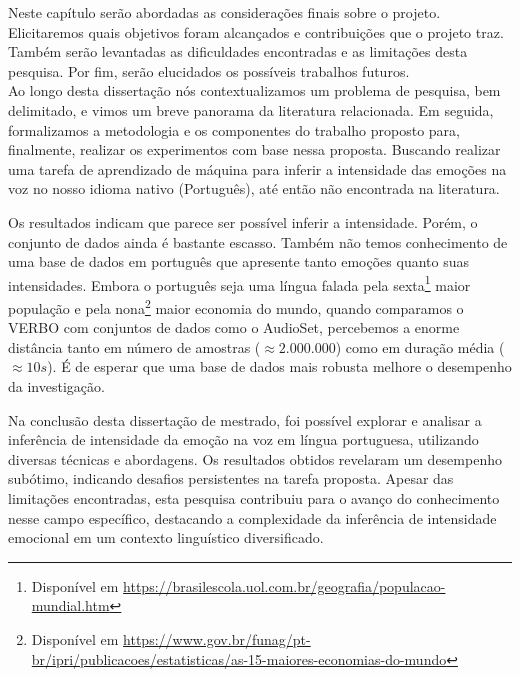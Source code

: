 
Neste capítulo serão abordadas as considerações finais sobre o projeto. Elicitaremos quais objetivos foram alcançados e contribuições que o projeto traz. Também serão levantadas as dificuldades encontradas e as limitações desta pesquisa. Por fim, serão elucidados os possíveis trabalhos futuros.\\

Ao longo desta dissertação nós contextualizamos um problema de pesquisa, bem delimitado, e vimos um breve panorama da literatura relacionada. Em seguida, formalizamos a metodologia e os componentes do trabalho proposto para, finalmente, realizar os experimentos com base nessa proposta. Buscando realizar uma tarefa de aprendizado de máquina para inferir a intensidade das emoções na voz no nosso idioma nativo (Português), até então não encontrada na literatura.

Os resultados indicam que parece ser possível inferir a intensidade. Porém, o conjunto de dados ainda é bastante escasso. Também não temos conhecimento de uma base de dados em português que apresente tanto emoções quanto suas intensidades. Embora o português seja uma língua falada pela sexta\footnote{Disponível em \url{https://brasilescola.uol.com.br/geografia/populacao-mundial.htm}} maior população e pela nona\footnote{Disponível em \url {https://www.gov.br/funag/pt-br/ipri/publicacoes/estatisticas/as-15-maiores-economias-do-mundo}} maior economia do mundo, quando comparamos o VERBO com conjuntos de dados como o AudioSet, percebemos a enorme distância tanto em número de amostras ($\approx 2.000.000$) como em duração média ($\approx 10s$). É de esperar que uma base de dados mais robusta melhore o desempenho da investigação.


Na conclusão desta dissertação de mestrado, foi possível explorar e analisar a inferência de intensidade da emoção na voz em língua portuguesa, utilizando diversas técnicas e abordagens. Os resultados obtidos revelaram um desempenho subótimo, indicando desafios persistentes na tarefa proposta. Apesar das limitações encontradas, esta pesquisa contribuiu para o avanço do conhecimento nesse campo específico, destacando a complexidade da inferência de intensidade emocional em um contexto linguístico diversificado.

